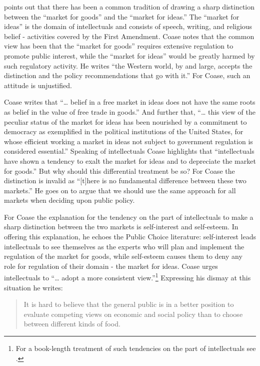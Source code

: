 \documentclass[11pt,]{article}
\begin{document}
\citet{Coase1974} points out that there has been a common tradition of
drawing a sharp distinction between the ``market for goods'' and the
``market for ideas.'' The ``market for ideas'' is the domain of
intellectuals and consists of speech, writing, and religious belief -
activities covered by the First Amendment. Coase notes that the common
view has been that the ``market for goods'' requires extensive
regulation to promote public interest, while the ``market for ideas''
would be greatly harmed by such regulatory activity. He writes ``the
Western world, by and large, accepts the distinction and the policy
recommendations that go with it.'' For Coase, such an attitude is
unjustified.

Coase writes that ``\ldots{} belief in a free market in ideas does not
have the same roots as belief in the value of free trade in goods.'' And
further that, ``\ldots{} this view of the peculiar status of the market
for ideas has been nourished by a commitment to democracy as exemplified
in the political institutions of the United States, for whose efficient
working a market in ideas not subject to government regulation is
considered essential.'' Speaking of intellectuals Coase highlights that
``intellectuals have shown a tendency to exalt the market for ideas and
to depreciate the market for goods.'' But why should this differential
treatment be so? For Coase the distinction is invalid as ``{[}t{]}here
is no fundamental difference between these two markets.'' He goes on to
argue that we should use the same approach for all markets when deciding
upon public policy.

For Coase the explanation for the tendency on the part of intellectuals
to make a sharp distinction between the two markets is self-interest and
self-esteem. In offering this explanation, he echoes the Public Choice
literature: self-interest leads intellectuals to see themselves as the
experts who will plan and implement the regulation of the market for
goods, while self-esteem causes them to deny any role for regulation of
their domain - the market for ideas. Coase urges intellectuals to
``\ldots{} adopt a more consistent view.''\footnote{For a book-length
  treatment of such tendencies on the part of intellectuals see
  \citet{Sowell2009}.} Expressing his dismay at this situation he
writes:

\begin{quote}
It is hard to believe that the general public is in a better position to
evaluate competing views on economic and social policy than to choose
between different kinds of food.
\end{quote}
\end{document}
